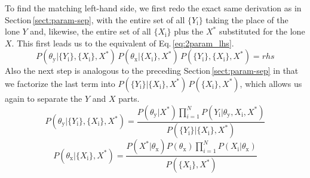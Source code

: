 \documentclass[]{report}
\begin{document}
To find the matching left-hand side, we first redo the exact same derivation as in Section\,\ref{sect:param-sep}, with the entire set of all $\{Y_\mathrm{i}\}$ taking the place of the lone $Y$ and, likewise, the entire set of all $\{X_\mathrm{i}\}$ plus the $X^*$ substituted for the lone $X$. This first leads us to the equivalent of Eq.\,\ref{eq:2param_lhs}.
\begin{equation}
P(\theta_\mathrm{y}|\{Y_\mathrm{i}\}, \{X_\mathrm{i}\}, X^*)\,P(\theta_\mathrm{x}|\{X_\mathrm{i}\}, X^*)\,P(\{Y_\mathrm{i}\}, \{X_\mathrm{i}\}, X^*)=rhs
\end{equation}
Also the next step is analogous to the preceding Section\,\ref{sect:param-sep} in that we factorize the last term into $P(\{Y_\mathrm{i}\}| \{X_\mathrm{i}\}, X^*)\,P(\{X_\mathrm{i}\}, X^*)$, which allows us again to separate the $Y$ and $X$ parts.
\begin{equation} \label{eq:2params_obs_Y}
P(\theta_\mathrm{y}|\{Y_\mathrm{i}\}, \{X_\mathrm{i}\}, X^*) = \frac{P(\theta_\mathrm{y}|X^*)\prod_{i=1}^{N}P(Y_\mathrm{i}|\theta_\mathrm{y}, X_\mathrm{i}, X^*)}{P(\{Y_\mathrm{i}\}| \{X_\mathrm{i}\}, X^*)} 
\end{equation}
\begin{equation} \label{eq:2params_obs_X}
P(\theta_\mathrm{x}|\{X_\mathrm{i}\}, X^*) = \frac{P(X^*|\theta_\mathrm{x})P(\theta_\mathrm{x})\prod_{i=1}^{N}P(X_\mathrm{i}|\theta_\mathrm{x})}{P(\{X_\mathrm{i}\}, X^*)} 
\end{equation}
\end{document}
